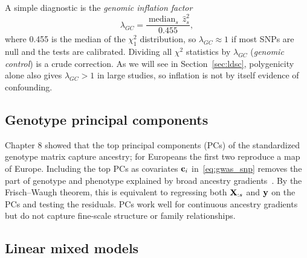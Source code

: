 A simple diagnostic is the \emph{genomic inflation factor}~\citep{devlin1999}
\begin{equation}
  \lambda_{GC} = \frac{\operatorname{median}_s\,\hat z_s^2}{0.455},
\end{equation}
where 0.455 is the median of the $\chi^2_1$ distribution, so $\lambda_{GC}\approx1$ if most SNPs are null and the tests are calibrated. Dividing all $\chi^2$ statistics by $\lambda_{GC}$ (\emph{genomic control}) is a crude correction. As we will see in Section~\ref{sec:ldsc}, polygenicity alone also gives $\lambda_{GC}>1$ in large studies, so inflation is not by itself evidence of confounding.

\subsection{Genotype principal components}

Chapter 8 showed that the top principal components (PCs) of the standardized genotype matrix capture ancestry; for Europeans the first two reproduce a map of Europe. Including the top PCs as covariates $\mathbf{c}_i$ in~\eqref{eq:gwas_snp} removes the part of genotype and phenotype explained by broad ancestry gradients~\citep{price2006}. By the Frisch--Waugh theorem, this is equivalent to regressing both $\mathbf{X}_{:s}$ and $\mathbf{y}$ on the PCs and testing the residuals. PCs work well for continuous ancestry gradients but do not capture fine-scale structure or family relationships.

\subsection{Linear mixed models}

